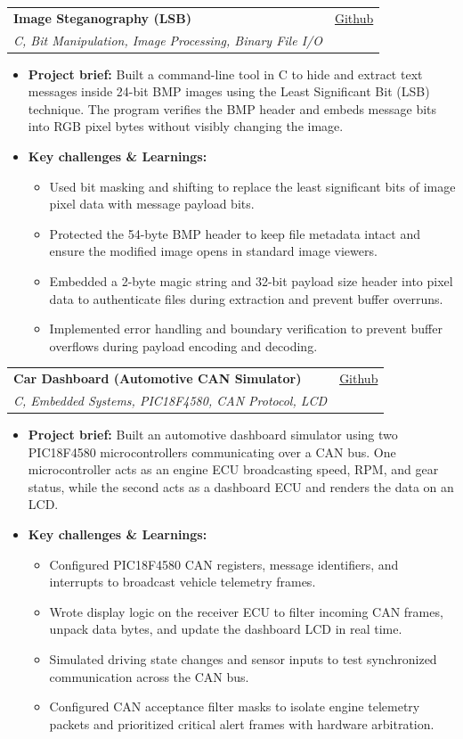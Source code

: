 \documentclass[letterpaper,11pt]{article}
\makeatletter
\newcommand{\resumeItem}[1]{
  \item
    {#1 \vspace{-2pt}}
}
\newcommand{\resumeSubheading}[4]{
  \vspace{-2pt}\item
    \begin{tabular*}{0.97\textwidth}[t]{l@{\extracolsep{\fill}}r}
      \textbf{#1} & #2 \\
      \textit{#3} & {#4} \\
    \end{tabular*}\vspace{-7pt}
}
\newcommand{\resumeItemListStart}{\begin{itemize}[topsep=2pt, itemsep=2pt, parsep=0pt]}
\newcommand{\resumeItemListEnd}{\end{itemize}\vspace{-5pt}}
\makeatother
\begin{document}
    \resumeSubheading
      {Image Steganography (LSB)}{\href{https://github.com/k0-R0/Steganography}{Github}}
      {C, Bit Manipulation, Image Processing, Binary File I/O}{}
      \resumeItemListStart
        \resumeItem{\textbf{Project brief:} Built a command-line tool in C to hide and extract text messages inside 24-bit BMP images using the Least Significant Bit (LSB) technique. The program verifies the BMP header and embeds message bits into RGB pixel bytes without visibly changing the image.}
        \resumeItem{\textbf{Key challenges \& Learnings:}}
        \resumeItemListStart
            \resumeItem{Used bit masking and shifting to replace the least significant bits of image pixel data with message payload bits.}
            \resumeItem{Protected the 54-byte BMP header to keep file metadata intact and ensure the modified image opens in standard image viewers.}
            \resumeItem{Embedded a 2-byte magic string and 32-bit payload size header into pixel data to authenticate files during extraction and prevent buffer overruns.}
            \resumeItem{Implemented error handling and boundary verification to prevent buffer overflows during payload encoding and decoding.}
        \resumeItemListEnd
      \resumeItemListEnd

    \resumeSubheading
      {Car Dashboard (Automotive CAN Simulator)}{\href{https://github.com/k0-R0/Car_Dashboard}{Github}}
      {C, Embedded Systems, PIC18F4580, CAN Protocol, LCD}{}
      \resumeItemListStart
        \resumeItem{\textbf{Project brief:} Built an automotive dashboard simulator using two PIC18F4580 microcontrollers communicating over a CAN bus. One microcontroller acts as an engine ECU broadcasting speed, RPM, and gear status, while the second acts as a dashboard ECU and renders the data on an LCD.}
        \resumeItem{\textbf{Key challenges \& Learnings:}}
        \resumeItemListStart
            \resumeItem{Configured PIC18F4580 CAN registers, message identifiers, and interrupts to broadcast vehicle telemetry frames.}
            \resumeItem{Wrote display logic on the receiver ECU to filter incoming CAN frames, unpack data bytes, and update the dashboard LCD in real time.}
            \resumeItem{Simulated driving state changes and sensor inputs to test synchronized communication across the CAN bus.}
            \resumeItem{Configured CAN acceptance filter masks to isolate engine telemetry packets and prioritized critical alert frames with hardware arbitration.}
        \resumeItemListEnd
      \resumeItemListEnd

  \newpage
\end{document}
